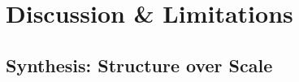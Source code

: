 \section{Discussion \& Limitations}
\label{ch:discussion}


\subsection{Synthesis: Structure over Scale}
\label{sec:discussion-synthesis}


